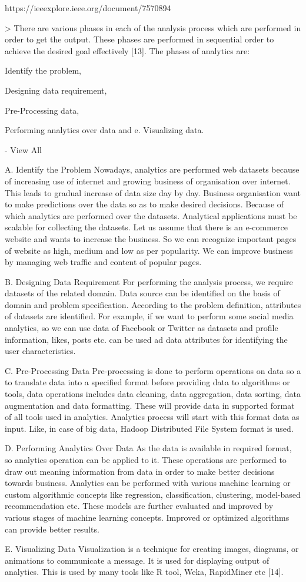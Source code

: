 https://ieeexplore.ieee.org/document/7570894

> There are various phases in each of the analysis process which are performed in order to get the output. These phases are performed in sequential order to achieve the desired goal effectively [13]. The phases of analytics are:

Identify the problem,

Designing data requirement,

Pre-Processing data,

Performing analytics over data and e. Visualizing data.

 - 
View All

A. Identify the Problem
Nowadays, analytics are performed web datasets because of increasing use of internet and growing business of organisation over internet. This leads to gradual increase of data size day by day. Business organisation want to make predictions over the data so as to make desired decisions. Because of which analytics are performed over the datasets. Analytical applications must be scalable for collecting the datasets. Let us assume that there is an e-commerce website and wants to increase the business. So we can recognize important pages of website as high, medium and low as per popularity. We can improve business by managing web traffic and content of popular pages.

B. Designing Data Requirement
For performing the analysis process, we require datasets of the related domain. Data source can be identified on the basis of domain and problem specification. According to the problem definition, attributes of datasets are identified. For example, if we want to perform some social media analytics, so we can use data of Facebook or Twitter as datasets and profile information, likes, posts etc. can be used ad data attributes for identifying the user characteristics.

C. Pre-Processing Data
Pre-processing is done to perform operations on data so a to translate data into a specified format before providing data to algorithms or tools, data operations includes data cleaning, data aggregation, data sorting, data augmentation and data formatting. These will provide data in supported format of all tools used in analytics. Analytics process will start with this format data as input. Like, in case of big data, Hadoop Distributed File System format is used.

D. Performing Analytics Over Data
As the data is available in required format, so analytics operation can be applied to it. These operations are performed to draw out meaning information from data in order to make better decisions towards business. Analytics can be performed with various machine learning or custom algorithmic concepts like regression, classification, clustering, model-based recommendation etc. These models are further evaluated and improved by various stages of machine learning concepts. Improved or optimized algorithms can provide better results.

E. Visualizing Data
Visualization is a technique for creating images, diagrams, or animations to communicate a message. It is used for displaying output of analytics. This is used by many tools like R tool, Weka, RapidMiner etc [14].